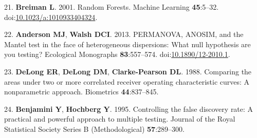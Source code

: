 \documentclass[12pt,]{article}
\begin{document}
\hypertarget{ref-breiman_random_2001}{}
21. \textbf{Breiman L}. 2001. Random Forests. Machine Learning
\textbf{45}:5--32.
doi:\href{https://doi.org/10.1023/a:1010933404324}{10.1023/a:1010933404324}.

\hypertarget{ref-anderson_permanova_2013}{}
22. \textbf{Anderson MJ}, \textbf{Walsh DCI}. 2013. PERMANOVA, ANOSIM,
and the Mantel test in the face of heterogeneous dispersions: What null
hypothesis are you testing? Ecological Monographs \textbf{83}:557--574.
doi:\href{https://doi.org/10.1890/12-2010.1}{10.1890/12-2010.1}.

\hypertarget{ref-delong_comparing_1988}{}
23. \textbf{DeLong ER}, \textbf{DeLong DM}, \textbf{Clarke-Pearson DL}.
1988. Comparing the areas under two or more correlated receiver
operating characteristic curves: A nonparametric approach. Biometrics
\textbf{44}:837--845.

\hypertarget{ref-benjamini_controlling_1995}{}
24. \textbf{Benjamini Y}, \textbf{Hochberg Y}. 1995. Controlling the
false discovery rate: A practical and powerful approach to multiple
testing. Journal of the Royal Statistical Society Series B
(Methodological) \textbf{57}:289--300.
\end{document}
